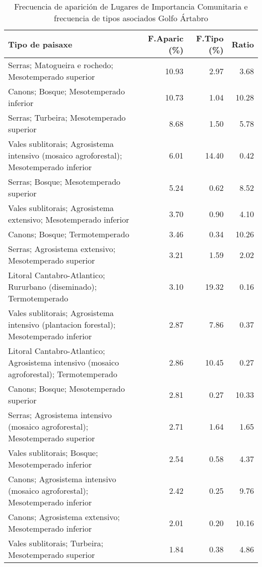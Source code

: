 \begin{table}[p]
\centering
\caption{Frecuencia de aparición de Lugares de Importancia Comunitaria e frecuencia de tipos asociados Golfo Ártabro} 
\label{vnatura1}
\begin{tabular}{lrrr}
  \hline
Tipo de paisaxe & F.Aparic (\%) & F.Tipo (\%) & Ratio \\ 
  \hline
Serras; Matogueira e rochedo; Mesotemperado superior & 10.93 & 2.97 & 3.68 \\ 
  Canons; Bosque; Mesotemperado inferior & 10.73 & 1.04 & 10.28 \\ 
  Serras; Turbeira; Mesotemperado superior & 8.68 & 1.50 & 5.78 \\ 
  Vales sublitorais; Agrosistema intensivo (mosaico agroforestal); Mesotemperado inferior & 6.01 & 14.40 & 0.42 \\ 
  Serras; Bosque; Mesotemperado superior & 5.24 & 0.62 & 8.52 \\ 
  Vales sublitorais; Agrosistema extensivo; Mesotemperado inferior & 3.70 & 0.90 & 4.10 \\ 
  Canons; Bosque; Termotemperado & 3.46 & 0.34 & 10.26 \\ 
  Serras; Agrosistema extensivo; Mesotemperado superior & 3.21 & 1.59 & 2.02 \\ 
  Litoral Cantabro-Atlantico; Rururbano (diseminado); Termotemperado & 3.10 & 19.32 & 0.16 \\ 
  Vales sublitorais; Agrosistema intensivo (plantacion forestal); Mesotemperado inferior & 2.87 & 7.86 & 0.37 \\ 
  Litoral Cantabro-Atlantico; Agrosistema intensivo (mosaico agroforestal); Termotemperado & 2.86 & 10.45 & 0.27 \\ 
  Canons; Bosque; Mesotemperado superior & 2.81 & 0.27 & 10.33 \\ 
  Serras; Agrosistema intensivo (mosaico agroforestal); Mesotemperado superior & 2.71 & 1.64 & 1.65 \\ 
  Vales sublitorais; Bosque; Mesotemperado inferior & 2.54 & 0.58 & 4.37 \\ 
  Canons; Agrosistema intensivo (mosaico agroforestal); Mesotemperado inferior & 2.42 & 0.25 & 9.76 \\ 
  Canons; Agrosistema extensivo; Mesotemperado inferior & 2.01 & 0.20 & 10.16 \\ 
  Vales sublitorais; Turbeira; Mesotemperado superior & 1.84 & 0.38 & 4.86 \\ 

\end{tabular}
\end{table}
